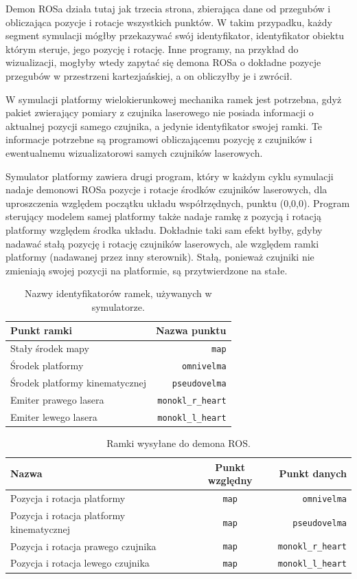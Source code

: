 		Demon ROSa działa tutaj jak trzecia strona, zbierająca dane od przegubów i obliczająca pozycje i rotacje wszystkich punktów.
		W takim przypadku, każdy segment symulacji mógłby przekazywać swój identyfikator, identyfikator obiektu którym steruje, jego pozycję i rotację.
		Inne programy, na przykład do wizualizacji, mogłyby wtedy zapytać się demona ROSa o dokładne pozycje przegubów w przestrzeni kartezjańskiej, a on obliczyłby je i zwrócił.
		
		W symulacji platformy wielokierunkowej mechanika ramek jest potrzebna, gdyż pakiet zwierający pomiary z czujnika laserowego nie posiada informacji o aktualnej
		pozycji samego czujnika, a jedynie identyfikator swojej ramki. Te informacje potrzebne są programowi obliczającemu pozycję z czujników i ewentualnemu wizualizatorowi samych
		czujników laserowych.
		
		Symulator platformy zawiera drugi program, który w każdym cyklu symulacji nadaje demonowi ROSa pozycje i rotacje środków czujników laserowych, dla uproszczenia
		względem początku układu współrzędnych, punktu (0,0,0). 
		Program sterujący modelem samej platformy także nadaje ramkę z pozycją i rotacją platformy względem środka układu.
		Dokładnie taki sam efekt byłby, gdyby nadawać stałą pozycję i rotację czujników laserowych, ale względem ramki platformy (nadawanej przez inny sterownik).
		Stałą, ponieważ czujniki nie zmieniają swojej pozycji na platformie, są przytwierdzone na stałe.
		
		\begin{table}
			\centering
			\begin{tabular}{l r}
				Punkt ramki & Nazwa punktu \\
				\hline
				Stały środek mapy & \texttt{map} \\
				Środek platformy & \texttt{omnivelma} \\
				Środek platformy kinematycznej & \texttt{pseudovelma} \\
				Emiter prawego lasera & \texttt{monokl\_r\_heart} \\
				Emiter lewego lasera & \texttt{monokl\_l\_heart} \\
			\end{tabular}
			\caption{Nazwy identyfikatorów ramek, używanych w symulatorze.}
			\label{tab:frames}
		\end{table}
			
		\begin{table}
			\centering
			\begin{tabular}{l c r}
				Nazwa & Punkt względny & Punkt danych \\
				\hline
				Pozycja i rotacja platformy & \texttt{map} & \texttt{omnivelma} \\
				Pozycja i rotacja platformy kinematycznej & \texttt{map} & \texttt{pseudovelma} \\
				Pozycja i rotacja prawego czujnika & \texttt{map} & \texttt{monokl\_r\_heart} \\
				Pozycja i rotacja lewego czujnika & \texttt{map} & \texttt{monokl\_l\_heart} \\
			\end{tabular}
			\caption{Ramki wysyłane do demona ROS.}
			\label{tab:frame_send}
		\end{table}

